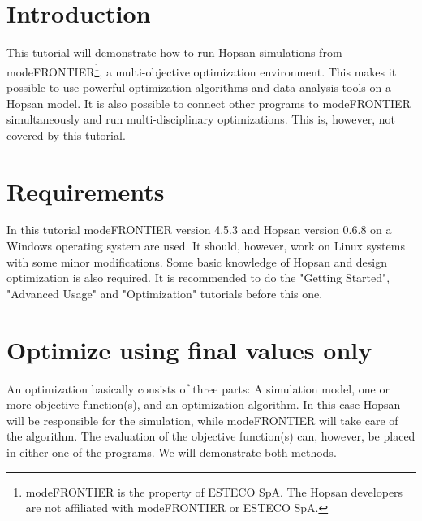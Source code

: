 \documentclass[a4paper]{article}
\begin{document}


\section*{Introduction}
This tutorial will demonstrate how to run Hopsan simulations from modeFRONTIER\footnote{modeFRONTIER is the property of ESTECO SpA. The Hopsan developers are not affiliated with modeFRONTIER or ESTECO SpA.}, a multi-objective optimization environment. This makes it possible to use powerful optimization algorithms and data analysis tools on a Hopsan model. It is also possible to connect other programs to modeFRONTIER simultaneously and run multi-disciplinary optimizations. This is, however, not covered by this tutorial.

\section*{Requirements}
In this tutorial modeFRONTIER version 4.5.3 and Hopsan version 0.6.8 on a Windows operating system are used. It should, however, work on Linux systems with some minor modifications. Some basic knowledge of Hopsan and design optimization is also required. It is recommended to do the "Getting Started", "Advanced Usage" and "Optimization" tutorials before this one.

\section*{Optimize using final values only}
An optimization basically consists of three parts: A simulation model, one or more objective function(s), and an optimization algorithm. In this case Hopsan will be responsible for the simulation, while modeFRONTIER will take care of the algorithm. The evaluation of the objective function(s) can, however, be placed in either one of the programs. We will demonstrate both methods.
\end{document}
